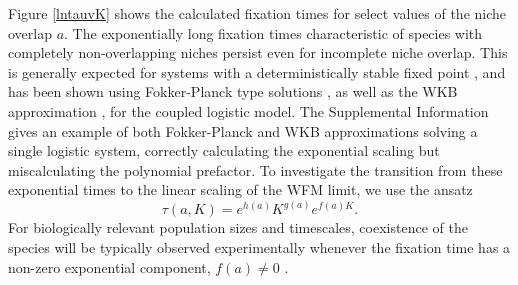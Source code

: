 \documentclass[a4paper,10pt]{article}
\numberwithin{equation}{section} %
\begin{document}
Figure \ref{lntauvK} shows the calculated fixation times for select values of the niche overlap $a$. 
The exponentially long fixation times characteristic of species with completely non-overlapping niches persist even for incomplete niche overlap. %
This is generally expected for systems with a deterministically stable fixed point \cite{Doering2005,Ovaskainen2010}, %
and has been shown using Fokker-Planck type solutions \cite{Chotibut2015,Dobrinevski2012,Lin2012}, as well as the WKB approximation \cite{Gabel2013}, for the coupled logistic model. 
The Supplemental Information gives an example of both Fokker-Planck and WKB approximations solving a single logistic system, correctly calculating the exponential scaling but miscalculating the polynomial prefactor. 
To investigate the transition from these exponential times to the linear scaling of the WFM limit, we use the ansatz 
\begin{equation} \label{ansatz2}
 \tau(a,K) = e^{h(a)}K^{g(a)}e^{f(a)K}.
\end{equation}
For biologically relevant population sizes and timescales, coexistence of the species will be typically observed experimentally whenever the fixation time has a non-zero exponential component, $f(a)\neq 0$ \cite{http://www.iucnredlist.org/static/categories_criteria_3_1}. %
\end{document}
